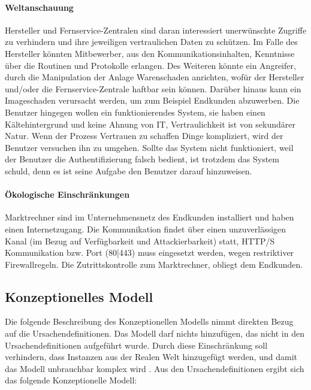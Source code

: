 \documentclass[11pt,a4paper]{report}
\begin{document}
\paragraph{Weltanschauung} Hersteller und Fernservice-Zentralen sind daran interessiert unerwünschte Zugriffe zu verhindern und ihre jeweiligen vertraulichen Daten zu schützen. Im Falle des Hersteller könnten Mitbewerber, aus den Kommunikationsinhalten, Kenntnisse über die Routinen und Protokolle erlangen. Des Weiteren könnte ein Angreifer, durch die Manipulation der Anlage Warenschaden anrichten, wofür der Hersteller und/oder die Fernservice-Zentrale haftbar sein können. Darüber hinaus kann ein Imageschaden verursacht werden, um zum Beispiel Endkunden abzuwerben. Die Benutzer hingegen wollen ein funktionierendes System, sie haben einen Kältehintergrund und keine Ahnung von IT, Vertraulichkeit ist von sekundärer Natur. Wenn der Prozess Vertrauen zu schaffen Dinge kompliziert, wird der Benutzer versuchen ihn zu umgehen. Sollte das System nicht funktioniert, weil der Benutzer die Authentifizierung falsch bedient, ist trotzdem das System schuld, denn es ist seine Aufgabe den Benutzer darauf hinzuweisen.

\paragraph{Ökologische Einschränkungen} Marktrechner sind im Unternehmensnetz des Endkunden installiert und haben einen Internetzugang. Die Kommunikation findet über einen unzuverlässigen Kanal (im Bezug auf Verfügbarkeit und Attackierbarkeit) statt, HTTP/S Kommunikation bzw. Port (80|443) muss eingesetzt werden, wegen restriktiver Firewallregeln. Die Zutrittskontrolle zum Marktrechner, obliegt dem Endkunden.

\subsection{Konzeptionelles Modell}

Die folgende Beschreibung des Konzeptionellen Modells nimmt direkten Bezug auf die Ursachendefinitionen. Das Modell darf nichts hinzufügen, das nicht in den Ursachendefinitionen aufgeführt wurde. Durch diese Einschränkung soll verhindern, dass Instanzen aus der Realen Welt hinzugefügt werden, und damit das Modell unbrauchbar komplex wird \cite{gutmann6}. Aus den Ursachendefinitionen ergibt sich das folgende Konzeptionelle Modell:
\end{document}
